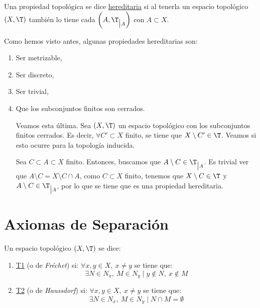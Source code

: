 \begin{definicion} Una propiedad topológica se dice \ul{hereditaria} si al tenerla un espacio topológico $(X, \T)$ también lo tiene cada $\left(A,\T_{\big| A}\right)$ con $A\subset X$.
\end{definicion}

Como hemos visto antes, algunas propiedades hereditarias son:
\begin{enumerate}
    \item Ser metrizable,
    \item Ser discreto,
    \item Ser trivial,
    \item Que los subconjuntos finitos son cerrados.
    
    Veamos esta última. Sea $(X,\T)$ un espacio topológico con los subconjuntos finitos cerrados. Es decir, $\forall C'\subset X$ finito, se tiene que $X\setminus C'\in \T$. Veamos si esto ocurre para la topología inducida.

    Sea $C\subset A\subset X$ finito. Entonces, buscamos que $A\setminus C\in \T_{\big| A}$. Es trivial ver que $A\setminus C = X\setminus C\cap A$, como $C\subset X$ finito, tenemos que $X\setminus C\in \T$ y $A\setminus C\in \T_{\big| A}$, por lo que se tiene que es una propiedad hereditaria.
\end{enumerate}



\section{Axiomas de Separación}
\begin{definicion}
    Un espacio topológico $(X,\T)$ se dice:
    \begin{enumerate}
        \item \ul{T1} (o de \emph{Fréchet}) si: $\forall x,y\in X,~x\neq y$ se tiene que:
        \begin{equation*}
            \exists N\in N_x,~M\in N_y \mid y\notin N,~x\notin M
        \end{equation*}

        \item \ul{T2} (o de \emph{Haussdorf}) si: $\forall x,y\in X,~x\neq y$ se tiene que:
        \begin{equation*}
            \exists N\in N_x,~M\in N_y \mid N\cap M=\emptyset
        \end{equation*}
    \end{enumerate}
\end{definicion}

